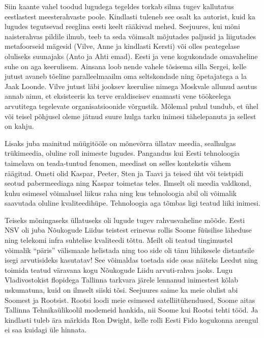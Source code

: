 Siin kaante vahel toodud lugudega tegeldes torkab silma tugev kallutatus 
eestlastest meesterahvaste poole. Kindlasti tuleneb see osalt ka autorist, kuid 
ka lugudes tegutsevad reeglina eesti keelt rääkivad mehed. Seejuures, kui mõni 
naisterahvas pildile ilmub, teeb ta seda võimsalt mõjutades paljusid ja 
liigutades metafoorseid mägesid (Vilve, 
Anne ja kindlasti Kersti) või olles peategelase oluliseks suunajaks (Anto ja Ahti emad). Eesti 
ja vene kogukondade omavaheline suhe on aga keerulisem. Ainsana loob nende 
vahele tõsisema silla Sergei, kelle jutust avaneb 
tõeline paralleelmaailm oma seltskondade ning õpetajatega a la Jaak Loonde. 
Vilve jutust läbi jooksev keerulise nimega Moskvale allunud asutus annab aimu, 
et eksisteeris ka terve eraldiseisev enamasti vene töökeelega arvutitega 
tegelevate organisatsioonide võrgustik. Mõlemal puhul tundub, et ühel või 
teisel põhjusel oleme jätnud suure hulga tarku inimesi tähelepanuta ja sellest 
on kahju.

Lisaks juba mainitud müügitööle on mõnevõrra üllatav meedia, sealhulgas 
trükimeedia, oluline roll inimeste lugudes. Pangandus kui Eesti tehnoloogia 
taimelava on teada-tuntud fenomen, meediast on selles kontekstis vähem 
räägitud. Ometi olid Kaspar, Peeter, Sten ja Taavi ja teised üht või teistpidi 
seotud pabermeediaga ning Kaspar toimetas teles. Ilmselt oli meedia valdkond, 
kuhu esimesel võimalusel liikus raha ning kus tehnoloogia abil oli võimalik 
saavutada oluline kvaliteedihüpe. Tehnoloogia aga tõmbas ligi teatud liiki 
inimesi.

Teiseks mõningaseks üllatuseks oli lugude tugev rahvusvaheline mõõde. Eesti NSV 
oli juba Nõukogude Liidus teistest erinevas rollis Soome füüsilise läheduse 
ning telekomi infra suhtelise kvaliteedi tõttu. Meilt oli teatud tingimustel 
võimalik \enquote{päris} välismaale helistada ning too side oli tänu lühikesele 
distantsile isegi arvutisideks kasutatav! See võimaldas toetada side osas 
näiteks Leedut ning toimida teatud väravana kogu Nõukogude Liidu arvuti-rahva 
jaoks. Lugu Vladivostokist flopidega Tallinna tarkvara järele lennanud 
inimestest kõlab uskumatuna, kuid on ilmselt siiski tõsi. Seejuures saime ka 
meie olulist abi Soomest ja Rootsist. Rootsi loodi meie esimesed 
satelliitühendused, Soome aitas Tallinna Tehnikaülikoolil modemeid hankida, nii 
Soome kui Rootsi tehti tööd. Ja kindlasti tuleb ära märkida Ron 
Dwight, kelle rolli Eesti Fido kogukonna arengul ei saa 
kuidagi üle hinnata. 

